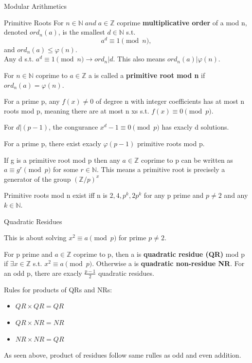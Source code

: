 \documentclass[12pt, letterpaper]{article}
\begin{document}
\begin{section}{Modular Arithmetics}
\begin{subsection}{Primitive Roots}
    For \(n \in \mathbb{N} \; and \; a \in \mathbb{Z}\) coprime
    \textbf{multiplicative order} of a mod n, denoted \(ord_{n}(a)\), is the
    smallest \(d \in \mathbb{N}\) s.t. \[a^{d} \equiv 1 \pmod{n},\] and
    \(ord_{n}(a) \leq \varphi(n)\). \\
    Any d s.t. \(a^{d} \equiv 1 \pmod{n} \to ord_{n} | d\). This also means
    \(ord_{n}(a) | \varphi(n)\).

    For \(n \in \mathbb{N}\) coprime to \(a \in \mathbb{Z}\) a is called a
    \textbf{primitive root mod n} if \(ord_{n}(a) = \varphi(n)\).

    For a prime p, any \(f(x) \neq 0\) of degree n with integer coefficients has
    at most n roots mod p, meaning there are at most n xs s.t. \(f(x) \equiv 0 \pmod{p}\).

    For \(d | (p - 1)\), the congurance \(x^{d} - 1 \equiv 0 \pmod{p}\) has
    exacly d solutions.

    For a prime p, there exist exacly \(\varphi(p - 1)\) primitive roots mod p.

    If g is a primitive root mod p then any \(a \in \mathbb{Z}\) coprime to p
    can be written as \(a \equiv g^{r} \pmod{p}\) for some \(r \in \mathbb{N}\).
    This means a primitive root is precisely a generator of the group \((\mathbb{Z} / p)^{x}\)

    Primitive roots mod n exist iff n is \(2, 4, p^{k}, 2p^{k}\) for any p prime
    and \(p \neq 2\) and any \(k \in \mathbb{N}\).

  \end{subsection}

  \begin{subsection}{Quadratic Residues}

    This is about solving \(x^{2} \equiv a \pmod{p}\) for prime \(p \neq 2\).

    For p prime and \(a \in \mathbb{Z}\) coprime to p, then a is \textbf{quadratic
      residue (QR)} mod p if \(\exists x \in \mathbb{Z}\) s.t.
    \(x^{2} \equiv a \pmod{p}\). Otherwise a is \textbf{quadratic non-residue NR}.
    For an odd p, there are exacly \(\frac{p - 1}{2}\) quadratic residues.

    Rules for products of QRs and NRs:
    \begin{itemize}
      \item \(QR \times QR = QR\)
      \item \(QR \times NR = NR\)
      \item \(NR \times NR = QR\)
    \end{itemize}
    As seen above, product of residues follow same rulles as
    odd and even addition.


\end{subsection}
\end{section}
\end{document}
